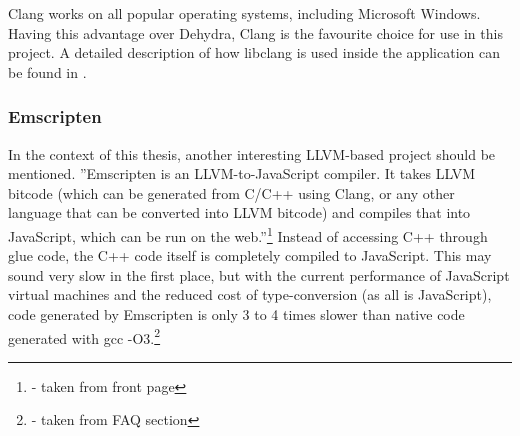 Clang works on all popular operating systems, including Microsoft Windows. Having this advantage over Dehydra, Clang is the favourite choice for use in this project. A detailed description of how libclang is used inside the application can be found in .

\subsubsection{Emscripten}

In the context of this thesis, another interesting LLVM-based project should be mentioned. ''Emscripten is an LLVM-to-JavaScript compiler. It takes LLVM bitcode (which can be generated from C/C++ using Clang, or any other language that can be converted into LLVM bitcode) and compiles that into JavaScript, which can be run on the web.''\footnote{\citep{EmscriptenHP} - taken from front page} Instead of accessing C++ through glue code, the C++ code itself is completely compiled to JavaScript. This may sound very slow in the first place, but with the current performance of JavaScript virtual machines and the reduced cost of type-conversion (as all is JavaScript), code generated by Emscripten is only 3 to 4 times slower than native code generated with gcc -O3.\footnote{\citep{EmscriptenHP} - taken from FAQ section}